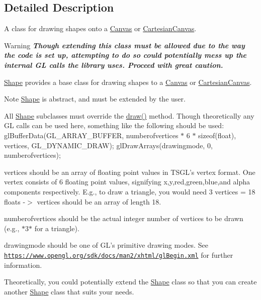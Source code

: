 \subsection{\-Detailed \-Description}
\-A class for drawing shapes onto a \hyperlink{classtsgl_1_1_canvas}{\-Canvas} or \hyperlink{classtsgl_1_1_cartesian_canvas}{\-Cartesian\-Canvas}. 

\begin{DoxyWarning}{\-Warning}
{\bfseries {\itshape \-Though extending this class must be allowed due to the way the code is set up, attempting to do so could potentially mess up the internal \-G\-L calls the library uses. \-Proceed with great caution.\/}}
\end{DoxyWarning}
\hyperlink{classtsgl_1_1_shape}{\-Shape} provides a base class for drawing shapes to a \hyperlink{classtsgl_1_1_canvas}{\-Canvas} or \hyperlink{classtsgl_1_1_cartesian_canvas}{\-Cartesian\-Canvas}. \begin{DoxyNote}{\-Note}
\hyperlink{classtsgl_1_1_shape}{\-Shape} is abstract, and must be extended by the user.
\end{DoxyNote}
\-All \hyperlink{classtsgl_1_1_shape}{\-Shape} subclasses must override the \hyperlink{classtsgl_1_1_shape_af78b1627b97d621824ce86db214e2402}{draw()} method. \-Though theoretically any \-G\-L calls can be used here, something like the following should be used\-: {\ttfamily  gl\-Buffer\-Data(\-G\-L\-\_\-\-A\-R\-R\-A\-Y\-\_\-\-B\-U\-F\-F\-E\-R, numberofvertices $\ast$ 6 $\ast$ sizeof(float), vertices, \-G\-L\-\_\-\-D\-Y\-N\-A\-M\-I\-C\-\_\-\-D\-R\-A\-W); gl\-Draw\-Arrays(drawingmode, 0, numberofvertices); }

{\ttfamily vertices} should be an array of floating point values in \-T\-S\-G\-L's vertex format. \-One vertex consists of 6 floating point values, signifying x,y,red,green,blue,and alpha components respectively. \-E.\-g., to draw a triangle, you would need 3 vertices = 18 floats -\/$>$ vertices should be an array of length 18.

{\ttfamily numberofvertices} should be the actual integer number of vertices to be drawn (e.\-g., $\ast$3$\ast$ for a triangle).

{\ttfamily drawingmode} should be one of \-G\-L's primitive drawing modes. \-See \href{https://www.opengl.org/sdk/docs/man2/xhtml/glBegin.xml}{\tt https\-://www.\-opengl.\-org/sdk/docs/man2/xhtml/gl\-Begin.\-xml} for further information.

\-Theoretically, you could potentially extend the \hyperlink{classtsgl_1_1_shape}{\-Shape} class so that you can create another \hyperlink{classtsgl_1_1_shape}{\-Shape} class that suits your needs.

